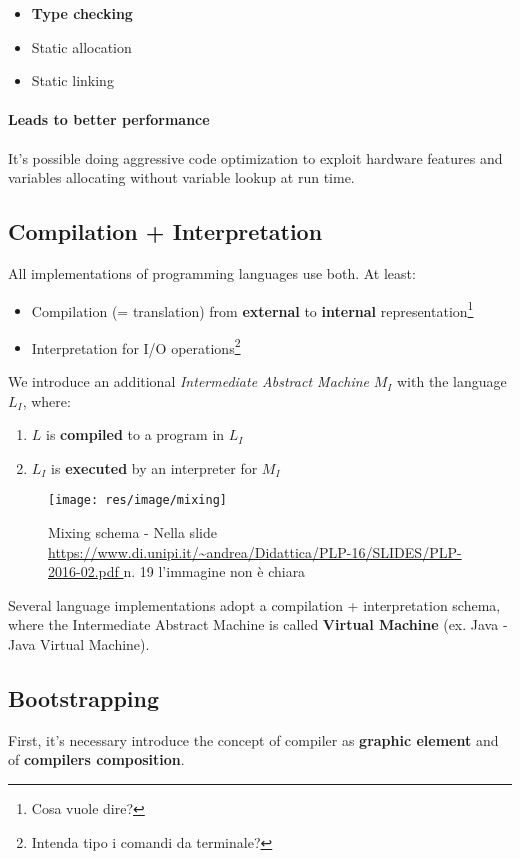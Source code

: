 \begin{itemize}
\item \textbf{Type checking}
\item Static allocation
\item Static linking
\end{itemize}

\paragraph{Leads to better performance}
It's possible doing aggressive code optimization to exploit hardware features
and variables allocating without variable lookup at run time.

\subsection{Compilation + Interpretation}
All implementations of programming languages use both. At least:
\begin{itemize}
\item Compilation (= translation) from \textbf{external} to \textbf{internal}
representation\footnote{Cosa vuole dire?}
\item Interpretation for I/O operations\footnote{Intenda tipo i comandi da
terminale?}
\end{itemize}

We introduce an additional \textit{Intermediate Abstract Machine} $M_I$ with the
language $L_I$, where:
\begin{enumerate}
\item $L$ is \textbf{compiled} to a program in $L_I$
\item $L_I$ is \textbf{executed} by an interpreter for $M_I$
\end{enumerate}

\begin{figure}[H]
\begin{center}
\texttt{[image: res/image/mixing]}
\caption{
Mixing schema - Nella slide \url{
https://www.di.unipi.it/~andrea/Didattica/PLP-16/SLIDES/PLP-2016-02.pdf
} n. 19 l'immagine non \`e chiara
}
\label{fig:mixing_schema}
\end{center}
\end{figure}

Several language implementations adopt a compilation + interpretation schema,
where the Intermediate Abstract Machine is called \textbf{Virtual Machine}
(ex. Java - Java Virtual Machine).

\subsection{Bootstrapping}
First, it's necessary introduce the concept of compiler as \textbf{graphic
element} and of \textbf{compilers composition}.

